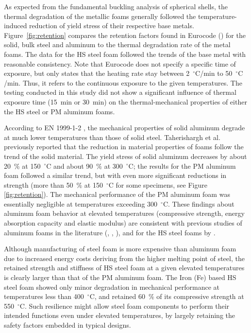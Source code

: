 \documentclass[review]{elsarticle}
\begin{document}
As expected from the fundamental buckling analysis of spherical shells, the thermal degradation of the metallic foams generally followed the temperature-induced reduction of yield stress of their respective base metals. Figure~\ref{fig:retention} compares the retention factors found in Eurocode (\cite{EC3-1-2}) for the solid, bulk steel and aluminum to the thermal degradation rate of the metal foams. The data for the HS steel foam followed the trends of the base metal with reasonable consistency. Note that Eurocode does not specify a specific time of exposure, but only states that the heating rate stay between 2~$^{\circ}\mathrm{C}$/min to 50~$^{\circ}\mathrm{C}$/min. Thus, it refers to the continuous exposure to the given temperatures. The testing conducted in this study did not show a significant influence of thermal exposure time (15~min or 30~min) on the thermal-mechanical properties of either the HS steel or PM aluminum foams.

According to EN 1999-1-2 \cite{EC9-1-2}, the mechanical properties of solid aluminum degrade at much lower temperatures than those of solid steel. Taherishargh et al. \cite{Taherishargh2018} previously reported that the reduction in material properties of foams follow the trend of the solid material. The yield stress of solid aluminum decreases by about 20~\% at 150~$^{\circ}\mathrm{C}$ and about 90~\% at 300~$^{\circ}\mathrm{C}$; the results for the PM aluminum foam followed a similar trend, but with even more significant reductions in strength (more than 50~\% at 150~$^{\circ}\mathrm{C}$ for some specimens, see Figure  \ref{fig:retention}). The mechanical performance of the PM aluminum foam was essentially negligible at temperatures exceeding 300~$^{\circ}\mathrm{C}$. These findings about aluminum foam behavior at elevated temperatures (compressive strength, energy absorption capacity and elastic modulus) are consistent with previous studies of aluminum foams in the literature (\cite{Aly2007}, \cite{Kovacicetal2016}, \cite{Liuetal2016}), and for the HS steel foams by \cite{BekozOktay2014}.

Although manufacturing of steel foam is more expensive than aluminum foam due to increased energy costs deriving from the higher melting point of steel, the retained strength and stiffness of HS steel foam at a given elevated temperatures is clearly larger than that of the PM aluminum foam. The Iron (Fe) based HS steel foam showed only minor degradation in mechanical performance at temperatures less than 400~$^{\circ}\mathrm{C}$, and retained 60~\% of its compressive strength at 550~$^{\circ}\mathrm{C}$. Such resilience might allow steel foam components to perform their intended functions even under elevated temperatures, by largely retaining the safety factors embedded in typical designs.
\end{document}
